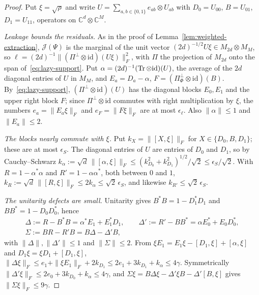 \begin{proof}
Put $\xi=\sqrt\rho$ and write $U=\sum_{a,b\in\{0,1\}}e_{ab}\otimes U_{ab}$ with $D_0=U_{00}$, $B=U_{01}$, $D_1=U_{11}$, operators on $\mathbb C^d\otimes\mathbb C^M$.

\emph{Leakage bounds the residuals.} As in the proof of Lemma~\ref{lem:weighted-extraction}, $\mathcal J(\Psi)$ is the marginal of the unit vector
$(2d)^{-1/2}U\xi\in M_{2d}\otimes M_M$, so $\ell=(2d)^{-1}\|(\Pi^\perp\otimes\mathrm{id})(U\xi)\|_F^2$, with $\Pi$ the projection of $M_{2d}$ onto the span
of~\eqref{eq:lazy-support}. Put $\alpha=(2d)^{-1}(\operatorname{Tr}\otimes\mathrm{id})(U)$, the average of the $2d$ diagonal entries of $U$ in $M_M$, and
$E_a=D_a-\alpha$, $F=(\Pi_\Phi^\perp\otimes\mathrm{id})(B)$. By~\eqref{eq:lazy-support}, $(\Pi^\perp\otimes\mathrm{id})(U)$ has the diagonal blocks $E_0,E_1$ and
the upper right block $F$; since $\Pi^\perp\otimes\mathrm{id}$ commutes with right multiplication by $\xi$, the numbers $e_a=\|E_a\xi\|_F$ and
$e_F=\|F\xi\|_F$ are at most $\epsilon_\ell$. Also $\|\alpha\|\le1$ and $\|E_a\|\le2$.

\emph{The blocks nearly commute with $\xi$.} Put $k_X=\|[X,\xi]\|_F$ for $X\in\{D_0,B,D_1\}$; these are at most $\epsilon_S$. The diagonal entries of
$U$ are entries of $D_0$ and $D_1$, so by Cauchy--Schwarz
$k_\alpha:=\sqrt d\,\|[\alpha,\xi]\|_F\le(k_{D_0}^2+k_{D_1}^2)^{1/2}/\sqrt2\le\epsilon_S/\sqrt2$. With $R=1-\alpha^*\alpha$ and
$R'=1-\alpha\alpha^*$, both between $0$ and $1$, $k_R:=\sqrt d\,\|[R,\xi]\|_F\le2k_\alpha\le\sqrt2\,\epsilon_S$, and likewise $k_{R'}\le\sqrt2\,\epsilon_S$.

\emph{The unitarity defects are small.} Unitarity gives $B^*B=1-D_1^*D_1$ and $BB^*=1-D_0D_0^*$, hence
\begin{gather*}
\Delta:=R-B^*B=\alpha^*E_1+E_1^*D_1,\qquad\Delta':=R'-BB^*=\alpha E_0^*+E_0D_0^*,\\
\Sigma:=BR-R'B=B\Delta-\Delta'B,
\end{gather*}
with $\|\Delta\|,\|\Delta'\|\le1$ and $\|\Sigma\|\le2$. From $\xi E_1=E_1\xi-[D_1,\xi]+[\alpha,\xi]$ and $D_1\xi=\xi D_1+[D_1,\xi]$,
$\|\Delta\xi\|_F\le e_1+\|\xi E_1\|_F+2k_{D_1}\le2e_1+3k_{D_1}+k_\alpha\le4\gamma$. Symmetrically $\|\Delta'\xi\|_F\le2e_0+3k_{D_0}+k_\alpha\le4\gamma$,
and $\Sigma\xi=B\Delta\xi-\Delta'\xi B-\Delta'[B,\xi]$ gives $\|\Sigma\xi\|_F\le9\gamma$.


\end{proof}
